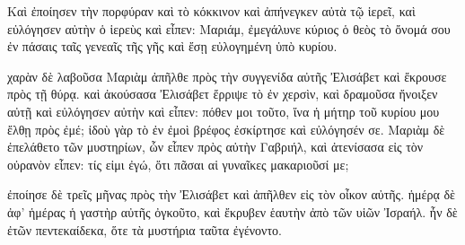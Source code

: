 \pend\pstart
{}

\pend\pstart
Καὶ ἐποίησεν τὴν πορφύραν καὶ τὸ κόκκινον καὶ ἀπήνεγκεν αὐτὰ τῷ ἱερεῖ, καὶ εὐλόγησεν αὐτὴν ὁ ἱερεὺς καὶ εἶπεν: Μαριάμ, ἐμεγάλυνε κύριος ὁ θεὸς τὸ ὄνομά σου ἐν πάσαις ταῖς γενεαῖς τῆς γῆς καὶ ἔσῃ εὐλογημένη ὑπὸ κυρίου.

\pend\pstart
χαρὰν δὲ λαβοῦσα Μαριὰμ ἀπῆλθε πρὸς τὴν συγγενίδα αὐτῆς Ἐλισάβετ καὶ ἔκρουσε πρὸς τῇ θύρᾳ. καὶ ἀκούσασα Ἐλισάβετ ἔρριψε τὸ ἐν χερσὶν, καὶ δραμοῦσα ἤνοιξεν αὐτῇ καὶ εὐλόγησεν αὐτὴν καὶ εἶπεν: πόθεν μοι τοῦτο, ἵνα ἡ μήτηρ τοῦ κυρίου μου ἔλθῃ πρὸς ἐμέ; ἰδοὺ γὰρ τὸ ἐν ἐμοὶ βρέφος ἐσκίρτησε καὶ εὐλόγησέν σε. Μαριὰμ δὲ ἐπελάθετο τῶν μυστηρίων, ὧν εἶπεν πρὸς αὐτὴν Γαβριήλ, καὶ ἀτενίσασα εἰς τὸν οὐρανὸν εἶπεν: τίς εἰμι ἐγώ, ὅτι πᾶσαι αἱ γυναῖκες μακαριοῦσί με;

\pend\pstart
ἐποίησε δὲ τρεῖς μῆνας πρὸς τὴν Ἐλισάβετ καὶ ἀπῆλθεν εἰς τὸν οἶκον αὐτῆς. ἡμέρᾳ δὲ ἀφ' ἡμέρας ἡ γαστὴρ αὐτῆς ὀγκοῦτο, καὶ ἔκρυβεν ἑαυτὴν ἀπὸ τῶν υἱῶν Ἰσραήλ. ἦν δὲ ἐτῶν πεντεκαίδεκα, ὅτε τὰ μυστήρια ταῦτα ἐγένοντο.

\pend\pstart
{}

\pend
